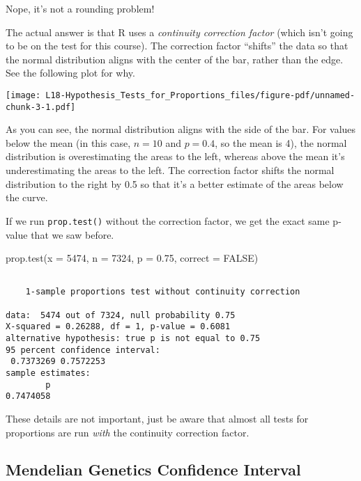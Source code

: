 \documentclass[
  letterpaper,
  DIV=11,
  numbers=noendperiod]{scrreprt}
\newenvironment{Shaded}{\begin{snugshade}}{\end{snugshade}}
\newcommand{\AttributeTok}[1]{\textcolor[rgb]{0.40,0.45,0.13}{#1}}
\newcommand{\ConstantTok}[1]{\textcolor[rgb]{0.56,0.35,0.01}{#1}}
\newcommand{\DecValTok}[1]{\textcolor[rgb]{0.68,0.00,0.00}{#1}}
\newcommand{\FloatTok}[1]{\textcolor[rgb]{0.68,0.00,0.00}{#1}}
\newcommand{\FunctionTok}[1]{\textcolor[rgb]{0.28,0.35,0.67}{#1}}
\newcommand{\NormalTok}[1]{\textcolor[rgb]{0.00,0.23,0.31}{#1}}
\begin{document}
Nope, it's not a rounding problem!

The actual answer is that R uses a \emph{continuity correction factor}
(which isn't going to be on the test for this course). The correction
factor ``shifts'' the data so that the normal distribution aligns with
the center of the bar, rather than the edge. See the following plot for
why.

\texttt{[image: L18-Hypothesis\_Tests\_for\_Proportions\_files/figure-pdf/unnamed-chunk-3-1.pdf]}

As you can see, the normal distribution aligns with the side of the bar.
For values below the mean (in this case, \(n=10\) and \(p=0.4\), so the
mean is 4), the normal distribution is overestimating the areas to the
left, whereas above the mean it's underestimating the areas to the left.
The correction factor shifts the normal distribution to the right by 0.5
so that it's a better estimate of the areas below the curve.

If we run \texttt{prop.test()} without the correction factor, we get the
exact same p-value that we saw before.

\begin{Shaded}
\begin{Highlighting}[]
\FunctionTok{prop.test}\NormalTok{(}\AttributeTok{x =} \DecValTok{5474}\NormalTok{, }\AttributeTok{n =} \DecValTok{7324}\NormalTok{, }\AttributeTok{p =} \FloatTok{0.75}\NormalTok{, }\AttributeTok{correct =} \ConstantTok{FALSE}\NormalTok{)}
\end{Highlighting}
\end{Shaded}

\begin{verbatim}

    1-sample proportions test without continuity correction

data:  5474 out of 7324, null probability 0.75
X-squared = 0.26288, df = 1, p-value = 0.6081
alternative hypothesis: true p is not equal to 0.75
95 percent confidence interval:
 0.7373269 0.7572253
sample estimates:
        p 
0.7474058 
\end{verbatim}

These details are not important, just be aware that almost all tests for
proportions are run \emph{with} the continuity correction factor.

\hypertarget{mendelian-genetics-confidence-interval}{%
\subsection{Mendelian Genetics Confidence
Interval}\label{mendelian-genetics-confidence-interval}}
\end{document}
